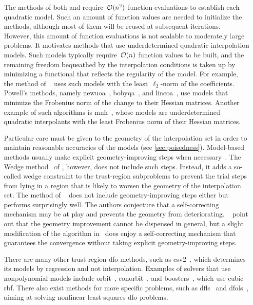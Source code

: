 The methods of both \citeauthor{Winfield_1969} and \citeauthor{Powell_2002} require~$\operatorname{\mathcal{O}}(n^2)$ function evaluations to establish each quadratic model.
Such an amount of function values are needed to initialize the methods, although most of them will be reused at subsequent iterations.
However, this amount of function evaluations is not scalable to moderately large problems.
It motivates methods that use underdetermined quadratic interpolation models.
Such models typically require~$\operatorname{\mathcal{O}}(n)$ function values to be built, and the remaining freedom bequeathed by the interpolation conditions is taken up by minimizing a functional that reflects the regularity of the model.
For example, the method of \citeauthor{Conn_Toint_1996}~\cite{Conn_Toint_1996} uses such models with the least~$\ell_2$-norm of the coefficients.
Powell's methods, namely \gls{newuoa}~\cite{Powell_2006}, \gls{bobyqa}~\cite{Powell_2009}, and \gls{lincoa}~\cite{Powell_2015}, use models that minimize the Frobenius norm of the change to their Hessian matrices.
Another example of such algorithms is \gls{mnh}~\cite{Wild_2008}, whose models are underdetermined quadratic interpolants with the least Frobenius norm of their Hessian matrices.

Particular care must be given to the geometry of the interpolation set in order to maintain reasonable accuracies of the models (see \cref{sec:poisedness}).
Model-based methods usually make explicit geometry-improving steps when necessary~\cite{Conn_Scheinberg_Vicente_2008a,Conn_Scheinberg_Vicente_2008b}.
The Wedge method~\cite{Marazzi_Nocedal_2002} of \citeauthor{Marazzi_Nocedal_2002}, however, does not include such steps.
Instead, it adds a so-called wedge constraint to the trust-region subproblems to prevent the trial steps from lying in a region that is likely to worsen the geometry of the interpolation set.
The method of \citeauthor{Fasano_Morales_Nocedal_2009}~\cite{Fasano_Morales_Nocedal_2009} does not include geometry-improving steps either but performs surprisingly well.
The authors conjecture that a self-correcting mechanism may be at play and prevents the geometry from deteriorating.
\citeauthor{Scheinberg_Toint_2010}~\cite{Scheinberg_Toint_2010} point out that the geometry improvement cannot be dispensed in general, but a slight modification of the algorithm in~\cite{Fasano_Morales_Nocedal_2009} does enjoy a self-correcting mechanism that guarantees the convergence without taking explicit geometry-improving steps.

There are many other trust-region \gls{dfo} methods, such as \gls{csv2}~\cite{Billups_Larson_Graf_2013}, which determines its models by regression and not interpolation.
Examples of solvers that use nonpolynomial models include \gls{orbit}~\cite{Wild_Regis_Shoemaker_2008}, \gls{conorbit}~\cite{Regis_Wild_2017}, and \gls{boosters}~\cite{Oeuvray_Bierlaire_2009}, which use cubic \gls{rbf}.
There also exist methods for more specific problems, such as \gls{dfls}~\cite{Zhang_Conn_Scheinberg_2010} and \gls{dfols}~\cite{Cartis_Etal_2019}, aiming at solving nonlinear least-squares \gls{dfo} problems.

